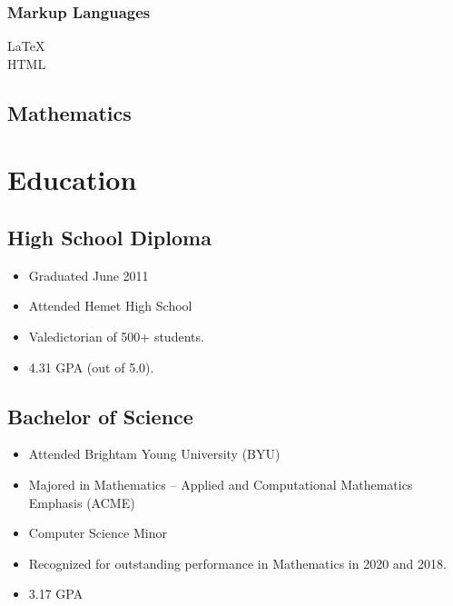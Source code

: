 \documentclass[11pt, letterpaper]{article}
\begin{document}
    \subsubsection*{Markup Languages}
      \begin{description}
        \item [\LaTeX]
        \item [HTML]
      \end{description}
  \subsection*{Mathematics}
    
\section*{Education}
  \subsection*{High School Diploma}
    \begin{itemize}
      \item Graduated June 2011
      \item Attended Hemet High School
      \item Valedictorian of 500+ students.
      \item 4.31 GPA (out of 5.0).
    \end{itemize}
  \subsection*{Bachelor of Science}
    \begin{itemize}
      \item Attended Brightam Young University (BYU)
      \item Majored in Mathematics -- Applied and Computational Mathematics Emphasis (ACME)
      \item Computer Science Minor
      \item Recognized for outstanding performance in Mathematics in 2020 and 2018.
      \item 3.17 GPA
    \end{itemize}
\end{document}
